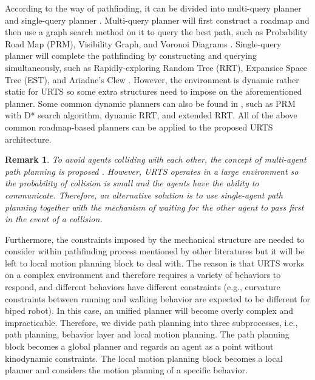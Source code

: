 \documentclass{ieeeaccess}
\newtheorem{remark}{Remark}
\begin{document}
According to the way of pathfinding, it can be divided into multi-query planner and single-query planner \cite{elbanhawi2014sampling}. Multi-query planner will first construct a roadmap and then use a graph search method on it to query the best path, such as Probability Road Map (PRM), Visibility Graph, and Voronoi Diagrams \cite{liu2018survey}. Single-query planner will complete the pathfinding by constructing and querying simultaneously,
such as Rapidly-exploring Random Tree (RRT), Expansice Space Tree (EST), and Ariadne's Clew \cite{elbanhawi2014sampling}. However, the environment is dynamic rather static for URTS so some extra structures need to impose on the aforementioned planner. Some common dynamic planners can also be found in \cite{elbanhawi2014sampling}, such as PRM with D* search algorithm, dynamic RRT, and extended RRT. All of the above common roadmap-based planners can be applied to the proposed URTS architecture.

\begin{remark}
    To avoid agents colliding with each other, the concept of multi-agent path planning is proposed \cite{yu2013multi}. However, URTS operates in a large environment so the probability of collision is small and the agents have the ability to communicate. Therefore, an alternative solution is to use single-agent path planning together with the mechanism of waiting for the other agent to pass first in the event of a collision.
\end{remark}

Furthermore, the constraints imposed by the mechanical structure are needed to consider within pathfinding process mentioned by other literatures but it will be left to local motion planning block to deal with. The reason is that URTS works on a complex environment and therefore requires a variety of behaviors to respond, and different behaviors have different constraints (e.g., curvature constraints between running and walking behavior are expected to be different for biped robot). In this case, an unified planner will become overly complex and impracticable. Therefore, we divide path planning into three subprocesses, i.e., path planning, behavior layer and local motion planning. The path planning block becomes a global planner and regards an agent as a point without kinodynamic constraints. The local motion planning block becomes a local planner and considers the motion planning of a specific behavior.
\end{document}
